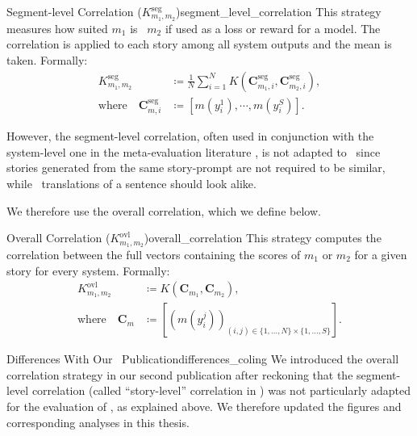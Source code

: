 \begin{defi}{Segment-level Correlation ($K^\textrm{seg}_{m_1,m_2}$)}{segment_level_correlation}
This strategy measures how suited $m_1$ is \wrt\ $m_2$ if used as a loss or reward for a model. The correlation is applied to each story among all system outputs and the mean is taken. Formally:
\begin{align}
K^\textrm{seg}_{m_1,m_2} & \coloneqq  \frac{1}{N} \sum_{i=1}^N K \left( \mathbf{C}^{\textrm{seg}}_{m_1, i}, \mathbf{C}^{\textrm{seg}}_{m_2, i} \right),\\
\text{where} \quad \mathbf{C}^\textrm{seg}_{m, i} & \coloneqq \left[ m\left(y_i^1\right),\cdots,m\left(y_i^S\right)\right].\nonumber
\end{align}
\end{defi}

However, the segment-level correlation, often used in conjunction with the system-level one in the meta-evaluation literature \citep{ma-etal-2019-results,bhandari2020re}, is not adapted to \ase\ since stories generated from the same story-prompt are not required to be similar, while \eg\ translations of a sentence should look alike.

We therefore use the overall correlation, which we define below.

\begin{defi}{Overall Correlation ($K^\textrm{ovl}_{m_1,m_2}$)}{overall_correlation}
This strategy computes the correlation between the full vectors containing the scores of $m_1$ or $m_2$ for a given story for every system. Formally:
\begin{align}
K^\textrm{ovl}_{m_1,m_2} & \coloneqq K \left( \mathbf{C}_{m_1},\mathbf{C}_{m_2} \right),\\
\text{where} \quad \mathbf{C}_{m} & \coloneqq \left[\left(m\left(y_i^j\right)\right)_{(i,j) \in \{1, \dots, N\} \times \{1, \dots, S\}}\right].\nonumber
\end{align}
\end{defi}

\begin{remk}{Differences With Our \coling\ Publication}{differences_coling}
    We introduced the overall correlation strategy in our second publication \citep{chhun2024do} after reckoning that the segment-level correlation (called ``story-level'' correlation in \citet{chhun-etal-2022-human}) was not particularly adapted for the evaluation of \asg, as explained above. We therefore updated the figures and corresponding analyses in this thesis.
\end{remk}

